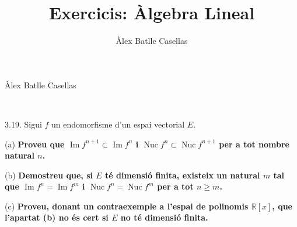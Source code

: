 \documentclass[11pt]{article}
\title{Exercicis: Àlgebra Lineal}
\author{Àlex Batlle Casellas}
\DeclareMathOperator{\nuc}{Nuc}
\DeclareMathOperator{\img}{Im}
\begin{document}
\begin{small}
Àlex Batlle Casellas
\end{small}\\

\begin{legal}
\item[3.19.] Sigui $f$ un endomorfisme d'un espai vectorial $E$.
	\item[(a) ]\textbf{Proveu que $\img{f^{n+1}}\subset\img{f^n}$ i $\nuc{f^n}\subset\nuc{f^{n+1}}$ per a tot nombre natural $n$.}\\
	\item[(b) ]\textbf{Demostreu que, si $E$ té dimensió finita, existeix un natural $m$ tal que $\img{f^n}=\img{f^m}$ i $\nuc{f^n}=\nuc{f^m}$ per a tot $n\geq m$.}\\
	\item[(c) ]\textbf{Proveu, donant un contraexemple a l’espai de polinomis $\mathbb{R}[x]$, que l’apartat (b) no és cert si $E$ no té dimensió finita.}\\
\end{legal}
\end{document}
